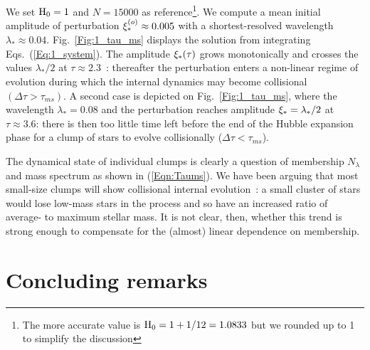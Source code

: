 We set ${\textrm{H}}_0 = 1$ and $N = 15 000$ as reference\footnote{The more accurate value is ${\textrm{H}}_0 = 1 + 1/12 = 1.0833$ but we rounded up to 1 to simplify the discussion}. We compute a mean initial amplitude of perturbation $\xi_\ast^{(o)} \approx 0.005 $ with a shortest-resolved wavelength $\lambda_\ast \approx 0.04$. Fig.~\ref{Fig:1_tau_ms} displays the solution from integrating Eqs.~(\ref{Eq:1_system}). The amplitude $\xi_\ast(\tau)$ grows monotonically and crosses the values $\lambda_\ast/2$ at $\tau \approx 2.3$~: thereafter the perturbation enters a non-linear regime of evolution during which the internal dynamics may become collisional $( \Delta\tau > \tau_{ms})$. A second case is depicted on Fig.~\ref{Fig:1_tau_ms}, where the wavelength $\lambda_\ast = 0.08$ and the perturbation reaches amplitude $\xi_\ast = \lambda_\ast/2$ at $\tau \approx 3.6$: there is then too little time left before the end of the Hubble expansion phase for a clump of stars to evolve collisionally ($\Delta\tau < \tau_{ms}$). 





The dynamical state of individual clumps is clearly a question of membership $N_\lambda$ and mass spectrum as shown in (\ref{Eqn:Taums}). We have been arguing that most small-size clumps will show collisional internal evolution~: a small cluster of stars would lose low-mass stars in the process and so have an increased ratio of average-    to maximum stellar mass. It is not clear, then, whether this trend is strong enough to compensate for the (almost) linear dependence on membership. 





\section{Concluding remarks}

